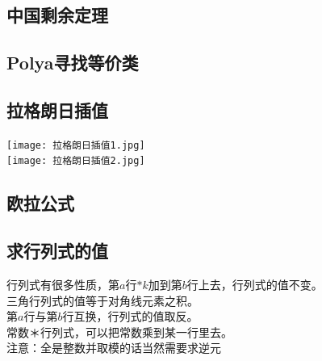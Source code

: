 \documentclass[11pt]{article}
\begin{document}
		\subsection{中国剩余定理}
		
		\subsection{Polya寻找等价类}
		
		\subsection{拉格朗日插值}
		\texttt{[image: 拉格朗日插值1.jpg]}\\
		\texttt{[image: 拉格朗日插值2.jpg]} 
		\subsection{欧拉公式}
		
		\subsection{求行列式的值}
			行列式有很多性质，第$a$行$*k$加到第$b$行上去，行列式的值不变。\\
			三角行列式的值等于对角线元素之积。\\
			第$a$行与第$b$行互换，行列式的值取反。\\
			常数＊行列式，可以把常数乘到某一行里去。\\
			注意：全是整数并取模的话当然需要求逆元
\end{document}
